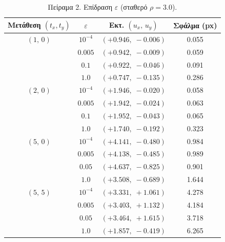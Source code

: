 \documentclass[12pt]{article}
\begin{document}
\begin{table}[H]
\centering
\small
\begin{tabular}{@{}cccc@{}}
\toprule
\textbf{Μετάθεση $(t_{x}, t_{y})$} & \textbf{$\varepsilon$} & \textbf{Εκτ. $(u_x,\,u_y)$} & \textbf{Σφάλμα (px)} \\
\midrule
$(1,\,0)$ & $10^{-4}$ & $(+0.946,\;-0.006)$ & 0.055 \\
          & $0.005$   & $(+0.942,\;-0.009)$ & 0.059 \\
          & $0.1$     & $(+0.922,\;-0.046)$ & 0.091 \\
          & $1.0$     & $(+0.747,\;-0.135)$ & 0.286 \\
\midrule
$(2,\,0)$ & $10^{-4}$ & $(+1.946,\;-0.020)$ & 0.058 \\
          & $0.005$   & $(+1.942,\;-0.024)$ & 0.063 \\
          & $0.1$     & $(+1.952,\;-0.043)$ & 0.065 \\
          & $1.0$     & $(+1.740,\;-0.192)$ & 0.323 \\
\midrule
$(5,\,0)$ & $10^{-4}$ & $(+4.141,\;-0.480)$ & 0.984 \\
          & $0.005$   & $(+4.138,\;-0.485)$ & 0.989 \\
          & $0.05$    & $(+4.637,\;-0.825)$ & 0.901 \\
          & $1.0$     & $(+3.508,\;-0.689)$ & 1.644 \\
\midrule
$(5,\,5)$ & $10^{-4}$ & $(+3.331,\;+1.061)$ & 4.278 \\
          & $0.005$   & $(+3.403,\;+1.132)$ & 4.184 \\
          & $0.05$    & $(+3.464,\;+1.615)$ & 3.718 \\
          & $1.0$     & $(+1.857,\;-0.419)$ & 6.265 \\
\bottomrule
\end{tabular}
\caption{Πείραμα 2. Επίδραση $\varepsilon$ (σταθερό $\rho=3.0$).}
\label{tab:lk_eps}
\end{table}
\end{document}
